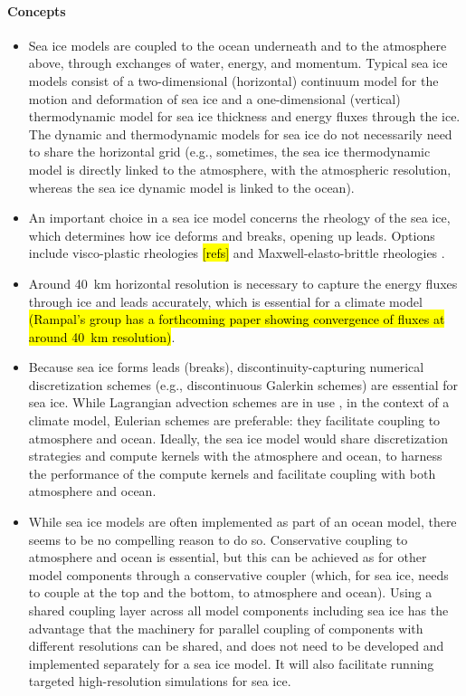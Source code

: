 \documentclass{article}
\begin{document}
\paragraph{Concepts}
\begin{itemize}
\item Sea ice models are coupled to the ocean underneath and to the atmosphere above, through exchanges of water, energy, and momentum. Typical sea ice models consist of a two-dimensional (horizontal) continuum model for the motion and deformation of sea ice and a one-dimensional (vertical) thermodynamic model \citep[e.g..][]{Semtner76a} for sea ice thickness and energy fluxes through the ice. The dynamic and thermodynamic models for sea ice do not necessarily need to share the horizontal grid (e.g., sometimes, the sea ice thermodynamic model is directly linked to the atmosphere, with the atmospheric resolution, whereas the sea ice dynamic model is linked to the ocean).
\item An important choice in a sea ice model concerns the rheology of the sea ice, which determines how ice deforms and breaks, opening up leads. Options include visco-plastic rheologies \hl{[refs]} and Maxwell-elasto-brittle rheologies \citep{Dansereau16a,Weiss17a,Dansereau17a}.
\item Around 40~km horizontal resolution is necessary to capture the energy fluxes through ice and leads accurately, which is essential for a climate model \hl{(Rampal's group has a forthcoming paper showing convergence of fluxes at around 40~km resolution)}.
\item Because sea ice forms leads (breaks), discontinuity-capturing numerical discretization schemes (e.g., discontinuous Galerkin schemes) are essential for sea ice. While Lagrangian advection schemes are in use \citep{Rampal16a}, in the context of a climate model, Eulerian schemes are preferable: they facilitate coupling to atmosphere and ocean. Ideally, the sea ice model would share discretization strategies and compute kernels with the atmosphere and ocean, to harness the performance of the compute kernels and facilitate coupling with both atmosphere and ocean.
\item While sea ice models are often implemented as part of an ocean model, there seems to be no compelling reason to do so. Conservative coupling to atmosphere and ocean is essential, but this can be achieved as for other model components through a conservative coupler (which, for sea ice, needs to couple at the top and the bottom, to atmosphere and ocean). Using a shared coupling layer across all model components including sea ice has the advantage that the machinery for parallel coupling of components with different resolutions can be shared, and does not need to be developed and implemented separately for a sea ice model. It will also facilitate running targeted high-resolution simulations for sea ice.

\end{itemize}
\end{document}
